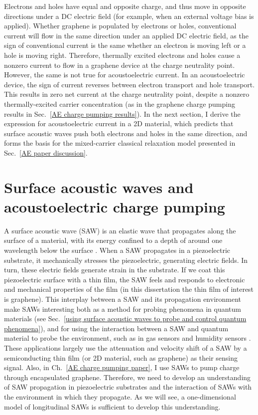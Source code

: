 \documentclass[double,12pt,1in,seploa]{beavtex}
\let\Oldsection\section
\renewcommand{\section}{\FloatBarrier\Oldsection}
\begin{document}
Electrons and holes have equal and opposite charge, and thus move in opposite directions under a DC electric field (for example, when an external voltage bias is applied). Whether graphene is populated by electrons or holes, conventional current will flow in the same direction under an applied DC electric field, as the sign of conventional current is the same whether an electron is moving left or a hole is moving right. Therefore, thermally excited electrons and holes cause a nonzero current to flow in a graphene device at the charge neutrality point. However, the same is not true for acoustoelectric current. In an acoustoelectric device, the sign of current reverses between electron transport and hole transport. This results in zero net current at the charge neutrality point, despite a nonzero thermally-excited carrier concentration (as in the graphene charge pumping results in Sec.\ \ref{AE charge pumping results}). In the next section, I derive the expression for acoustoelectric current in a 2D material, which predicts that surface acoustic waves push both electrons and holes in the same direction, and forms the basis for the mixed-carrier classical relaxation model presented in Sec.\ \ref{AE paper discussion}.

\section{Surface acoustic waves and acoustoelectric charge pumping}

A surface acoustic wave (SAW) is an elastic wave that propagates along the surface of a material, with its energy confined to a depth of around one wavelength below the surface \cite{rayleigh_waves_1885}. When a SAW propagates in a piezoelectric substrate, it mechanically stresses the piezoelectric, generating electric fields. In turn, these electric fields generate strain in the substrate. If we coat this piezoelectric surface with a thin film, the SAW feels and responds to electronic and mechanical properties of the film (in this dissertation the thin film of interest is graphene). This interplay between a SAW and its propagation environment make SAWs interesting both as a method for probing phenomena in quantum materials (see Sec.\ \ref{using surface acoustic waves to probe and control quantum phenomena}), and for using the interaction between a SAW and quantum material to probe the environment, such as in gas sensors and humidity sensors \cite{yang_gas_2017}. These applications largely use the attenuation and velocity shift of a SAW by a semiconducting thin film (or 2D material, such as graphene) as their sensing signal. Also, in Ch.\ \ref{AE charge pumping paper}, I use SAWs to pump charge through encapsulated graphene. Therefore, we need to develop an understanding of SAW propagation in piezoelectric substrates and the interaction of SAWs with the environment in which they propagate. As we will see, a one-dimensional model of longitudinal SAWs is sufficient to develop this understanding. 
\end{document}
